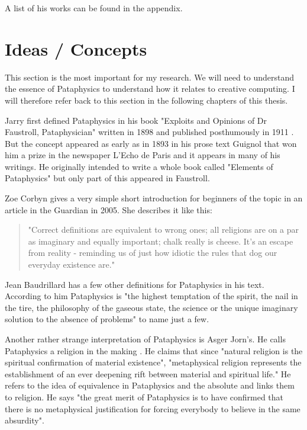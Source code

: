 A list of his works can be found in the appendix.

\section{Ideas / Concepts}

This section is the most important for my research. We will need to understand the essence of Pataphysics to understand how it relates to creative computing. I will therefore refer back to this section in the following chapters of this thesis.

Jarry first defined Pataphysics in his book "Exploits and Opinions of Dr Faustroll, Pataphysician" written in 1898 and published posthumously in 1911 \citep{Jarry1996}. But the concept appeared as early as in 1893 in his prose text Guignol that won him a prize in the newspaper L'Echo de Paris and it appears in many of his writings. He originally intended to write a whole book called "Elements of Pataphysics" but only part of this appeared in Faustroll.

Zoe Corbyn gives a very simple short introduction for beginners of the topic in an article in the Guardian \citep{Corbyn2005} in 2005. She describes it like this:

\begin{quote}
  "Correct definitions are equivalent to wrong ones; all religions are on a par as imaginary and equally important; chalk really is cheese. It's an escape from reality - reminding us of just how idiotic the rules that dog our everyday existence are."\citep{Jarry1996}
\end{quote}

Jean Baudrillard has a few other definitions for Pataphysics in his text\citep{Baudrillard2007}. According to him Pataphysics is "the highest temptation of the spirit, the nail in the tire, the philosophy of the gaseous state, the science or the unique imaginary solution to the absence of problems" to name just a few.

Another rather strange interpretation of Pataphysics is Asger Jorn's. He calls Pataphysics a religion in the making \citep{Jorn1961}. He claims that since "natural religion is the spiritual confirmation of material existence", "metaphysical religion represents the establishment of an ever deepening rift between material and spiritual life." He refers to the idea of equivalence in Pataphysics and the absolute and links them to religion. He says "the great merit of Pataphysics is to have confirmed that there is no metaphysical justification for forcing everybody to believe in the same absurdity".

